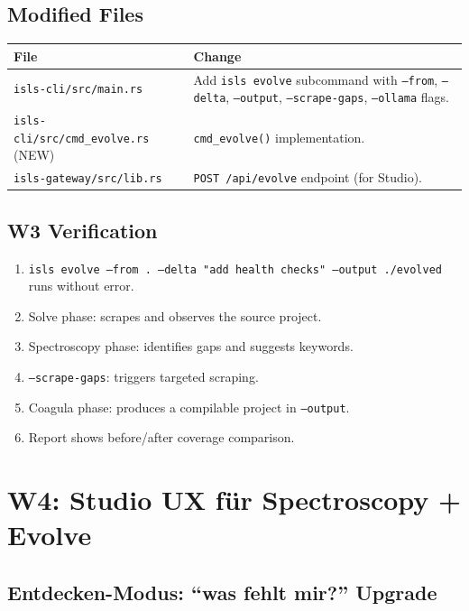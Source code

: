 \documentclass[11pt,a4paper]{article}
\begin{document}
\subsection{Modified Files}

\begin{longtable}{lp{10cm}}
\toprule
\textbf{File} & \textbf{Change} \\
\midrule
\texttt{isls-cli/src/main.rs}
  & Add \texttt{isls evolve} subcommand with 
    \texttt{--from}, \texttt{--delta}, \texttt{--output}, 
    \texttt{--scrape-gaps}, \texttt{--ollama} flags. \\
\texttt{isls-cli/src/cmd\_evolve.rs} (NEW)
  & \texttt{cmd\_evolve()} implementation. \\
\texttt{isls-gateway/src/lib.rs}
  & \texttt{POST /api/evolve} endpoint (for Studio). \\
\bottomrule
\end{longtable}

\subsection{W3 Verification}

\begin{enumerate}[nosep]
\item \texttt{isls evolve --from . --delta "add health checks" 
      --output ./evolved} runs without error.
\item Solve phase: scrapes and observes the source project.
\item Spectroscopy phase: identifies gaps and suggests keywords.
\item \texttt{--scrape-gaps}: triggers targeted scraping.
\item Coagula phase: produces a compilable project in 
      \texttt{--output}.
\item Report shows before/after coverage comparison.
\end{enumerate}


\section{W4: Studio UX f\"ur Spectroscopy + Evolve}
\label{sec:w4}

\subsection{Entdecken-Modus: ``was fehlt mir?'' Upgrade}
\end{document}
